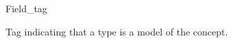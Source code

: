 \begin{ccRefClass}{Field_tag}
\label{Field_tag}

\ccDefinition
Tag indicating that a type is a model of the  concept. 

\ccInheritsFrom
{}

\ccIsModel
{}


\ccSeeAlso
{} \\
\\
\end{ccRefClass} 